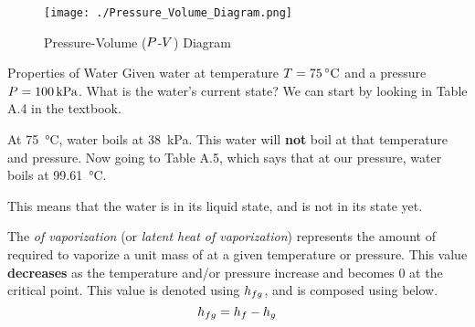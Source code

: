 \begin{figure}[h!tbp]
  \centering
  \texttt{[image: ./Pressure\_Volume\_Diagram.png]}
  \caption{Pressure-Volume ($P$-$V$) Diagram}
  \label{fig:Pressure_Volume_Diagram}
\end{figure}

\begin{example}{Properties of Water}
  Given water at temperature $\Temp = \SI{75}{\degreeCelsius}$ and a pressure $P = \SI{100}{\kilo\pascal}$.
  What is the water's current state?
  \tcblower{}
  We can start by looking in Table A.4 in the textbook.

  At \SI{75}{\degreeCelsius}, water boils at \SI{38}{\kilo\pascal}.
  This water will \textbf{not} boil at that temperature and pressure.
  Now going to Table A.5, which says that at our pressure, water boils at \SI{99.61}{\degreeCelsius}.

  This means that the water is in its liquid state, and is not in its  state yet.
\end{example}

\begin{definition}\label{def:Enthalpy_Vaporization}
  The \emph{ of vaporization} (or \emph{latent heat of vaporization}) represents the amount of  required to vaporize a unit mass of  at a given temperature or pressure.
  This value \textbf{decreases} as the temperature and/or pressure increase and becomes $0$ at the critical point.
  This value is denoted using $h_{fg}$, and is composed using  below.
  \begin{equation}\label{eq:Enthalpy_Vaporization}
    h_{fg} = h_{f} - h_{g}
  \end{equation}
\end{definition}





